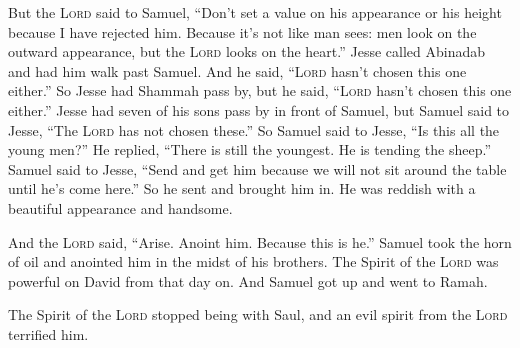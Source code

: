 \begin{inparaenum}
     But the \textsc{Lord} said to Samuel, ``Don't set a value on his appearance or his height because I have rejected him. Because it's not like man sees: men look on the outward appearance, but the \textsc{Lord} looks on the heart.''%
     Jesse called Abinadab and had him walk past Samuel. And he said, ``\textsc{Lord} hasn't chosen this one either.''%
     So Jesse had Shammah pass by, but he said, ``\textsc{Lord} hasn't chosen this one either.''%
     Jesse had seven of his sons pass by in front of Samuel, but Samuel said to Jesse, ``The \textsc{Lord} has not chosen these.''%
     So Samuel said to Jesse, ``Is this all the young men?'' He replied, ``There is still the youngest. He is tending the sheep.'' Samuel said to Jesse, ``Send and get him because we will not sit around the table until he's come here.''%
     So he sent and brought him in. He was reddish with a beautiful appearance and handsome.%
    
    And the \textsc{Lord} said, ``Arise. Anoint him. Because this is he.''%
     Samuel took the horn of oil and anointed him in the midst of his brothers. The Spirit of the \textsc{Lord} was powerful on David from that day on. And Samuel got up and went to Ramah.%
    
     The Spirit of the \textsc{Lord} stopped being with Saul, and an evil spirit from the \textsc{Lord} terrified him.%
    
\end{inparaenum}
